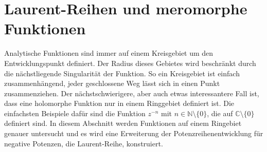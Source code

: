 %
%
%
\section{Laurent-Reihen und meromorphe Funktionen
\label{buch:analytisch:section:laurentreihen}}
Analytische Funktionen sind immer auf einem Kreisgebiet um den
Entwicklungspunkt definiert.
Der Radius dieses Gebietes wird beschränkt durch die nächstliegende
Singularität der Funktion.
So ein Kreisgebiet ist einfach zusammenhängend, jeder geschlossene
Weg lässt sich in einen Punkt zusammenziehen.
Der nächstschwierigere, aber auch etwas interessantere Fall ist,
dass eine holomorphe Funktion nur in einem Ringgebiet definiert ist.
Die einfachsten Beispiele dafür sind die Funktion $z^{-n}$ mit
$n\in\mathbb{N}\setminus\{0\}$, die auf $\mathbb{C}\setminus\{0\}$
definiert sind.
In diesem Abschnitt werden Funktionen auf einem Ringebiet genauer
untersucht und es wird eine Erweiterung der Potenzreihenentwicklung
für negative Potenzen, die Laurent-Reihe, konstruiert.






